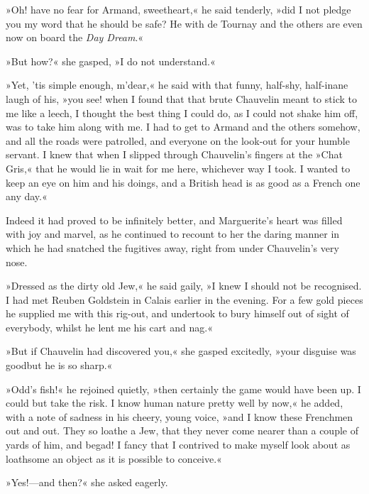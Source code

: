 »Oh! have no fear for Armand, sweetheart,« he said tenderly, »did I not pledge you my word that he should be safe? He with de Tournay and the others are even now on board the \textit{Day Dream}.«

»But how?« she gasped, »I do not understand.«

»Yet, 'tis simple enough, m'dear,« he said with that funny, half-shy, half-inane laugh of his, »you see! when I found that that brute Chauvelin meant to stick to me like a leech, I thought the best thing I could do, as I could not shake him off, was to take him along with me. I had to get to Armand and the others somehow, and all the roads were patrolled, and everyone on the look-out for your humble servant. I knew that when I slipped through Chauvelin's fingers at the »Chat Gris,« that he would lie in wait for me here, whichever way I took. I wanted to keep an eye on him and his doings, and a British head is as good as a French one any day.«

Indeed it had proved to be infinitely better, and Marguerite's heart was filled with joy and marvel, as he continued to recount to her the daring manner in which he had snatched the fugitives away, right from under Chauvelin's very nose.

»Dressed as the dirty old Jew,« he said gaily, »I knew I should not be recognised. I had met Reuben Goldstein in Calais earlier in the evening. For a few gold pieces he supplied me with this rig-out, and undertook to bury himself out of sight of everybody, whilst he lent me his cart and nag.«

»But if Chauvelin had discovered you,« she gasped excitedly, »your disguise was good\textellipsis \allowbreak  but he is so sharp.«

»Odd's fish!« he rejoined quietly, »then certainly the game would have been up. I could but take the risk. I know human nature pretty well by now,« he added, with a note of sadness in his cheery, young voice, »and I know these Frenchmen out and out. They so loathe a Jew, that they never come nearer than a couple of yards of him, and begad! I fancy that I contrived to make myself look about as loathsome an object as it is possible to conceive.«

»Yes!—and then?« she asked eagerly.

